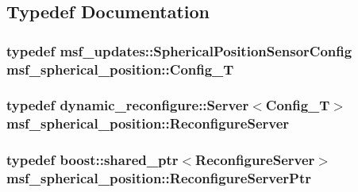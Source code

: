 \subsection{Typedef Documentation}
\hypertarget{namespacemsf__spherical__position_a48bbe0c42021c86a6ed32ae9c30df686}{
\subsubsection[{Config\-\_\-\-T}]{\setlength{\rightskip}{0pt plus 5cm}typedef msf\-\_\-updates\-::\-Spherical\-Position\-Sensor\-Config {\bf msf\-\_\-spherical\-\_\-position\-::\-Config\-\_\-\-T}}}\label{namespacemsf__spherical__position_a48bbe0c42021c86a6ed32ae9c30df686}
\hypertarget{namespacemsf__spherical__position_aac7e651c6eb11e553d7df1f1ac6eeebd}{
\subsubsection[{Reconfigure\-Server}]{\setlength{\rightskip}{0pt plus 5cm}typedef dynamic\-\_\-reconfigure\-::\-Server$<${\bf Config\-\_\-\-T}$>$ {\bf msf\-\_\-spherical\-\_\-position\-::\-Reconfigure\-Server}}}\label{namespacemsf__spherical__position_aac7e651c6eb11e553d7df1f1ac6eeebd}
\hypertarget{namespacemsf__spherical__position_aecf7024b0d845666e7cf52970e31217f}{
\subsubsection[{Reconfigure\-Server\-Ptr}]{\setlength{\rightskip}{0pt plus 5cm}typedef boost\-::shared\-\_\-ptr$<${\bf Reconfigure\-Server}$>$ {\bf msf\-\_\-spherical\-\_\-position\-::\-Reconfigure\-Server\-Ptr}}}\label{namespacemsf__spherical__position_aecf7024b0d845666e7cf52970e31217f}

